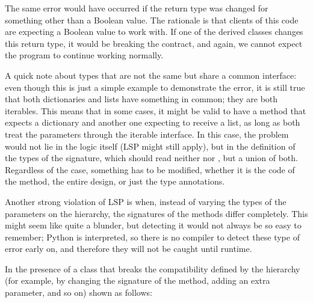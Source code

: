 \documentclass[a4paper,10pt,english]{sphinxmanual}
\begin{document}
The same error would have occurred if the return type was changed for something other
than a Boolean value. The rationale is that clients of this code are expecting a Boolean value
to work with. If one of the derived classes changes this return type, it would be breaking
the contract, and again, we cannot expect the program to continue working normally.

A quick note about types that are not the same but share a common interface: even though
this is just a simple example to demonstrate the error, it is still true that both dictionaries
and lists have something in common; they are both iterables. This means that in some cases,
it might be valid to have a method that expects a dictionary and another one expecting to
receive a list, as long as both treat the parameters through the iterable interface. In this case,
the problem would not lie in the logic itself (LSP might still apply), but in the definition of
the types of the signature, which should read neither  nor , but a union of both.
Regardless of the case, something has to be modified, whether it is the code of the method,
the entire design, or just the type annotations.

Another strong violation of LSP is when, instead of varying the types of the parameters on
the hierarchy, the signatures of the methods differ completely. This might seem like quite a
blunder, but detecting it would not always be so easy to remember; Python is interpreted,
so there is no compiler to detect these type of error early on, and therefore they will not be
caught until runtime.

In the presence of a class that breaks the compatibility defined by the hierarchy (for
example, by changing the signature of the method, adding an extra parameter, and so on)
shown as follows:

\begin{sphinxVerbatim}[commandchars=\\\{\}]
 
           
         
             
\end{sphinxVerbatim}
\end{document}
